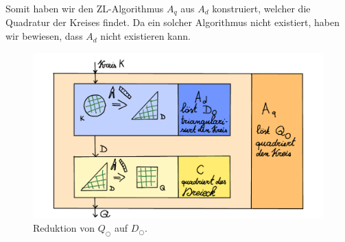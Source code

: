 \documentclass[
	12pt, %
	german, %
]{fphw}
\begin{document}
Somit haben wir den ZL-Algorithmus \(A_q\) aus \(A_d\) konstruiert, welcher die Quadratur der Kreises findet. Da ein solcher Algorithmus nicht existiert, haben wir bewiesen, dass \(A_d\) nicht existieren kann.
\begin{figure}[H]
	\centering
	\includegraphics[width=\textwidth]{Negativ.png}
	\caption{Reduktion von \(Q_{\bigcirc}\) auf \(D_{\bigcirc}\).}
\end{figure}
\end{document}
